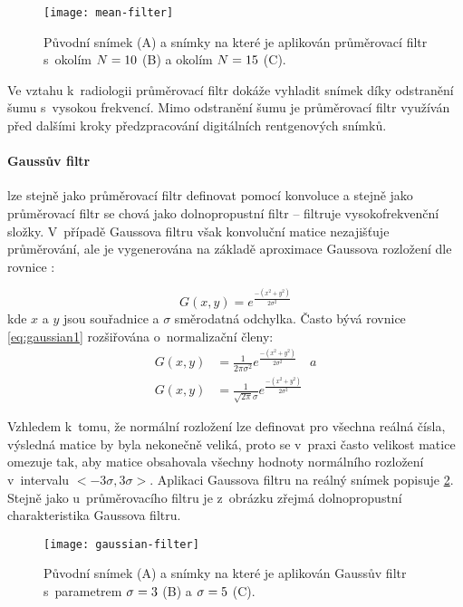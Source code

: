 \begin{figure}[htb]
\centering
\texttt{[image: mean-filter]}
\caption{Původní snímek (A) a snímky na které je aplikován průměrovací filtr s~okolím $\protect N=10$ (B) a okolím $\protect N=15$ (C).}
\label{fig:mean-filter}
\end{figure}

Ve vztahu k~radiologii průměrovací filtr dokáže vyhladit snímek díky odstranění šumu s~vysokou frekvencí. Mimo odstranění šumu je průměrovací filtr využíván před dalšími kroky předzpracování digitálních rentgenových snímků. \cite{Diagnostic-Radiology-Physics}

\paragraph{Gaussův filtr}
lze stejně jako průměrovací filtr definovat pomocí konvoluce a stejně jako průměrovací filtr se chová jako dolnopropustní filtr -- filtruje vysokofrekvenční složky. V~případě Gaussova filtru však konvoluční matice nezajišťuje průměrování, ale je vygenerována na základě aproximace Gaussova rozložení dle rovnice \cite[str.~139]{Image-Processing-Analysis-and-Machine-Vision}:

\begin{equation}
\label{eq:gaussian1}
G(x,y)=e^{\frac{-(x^2+y^2)}{2\sigma^2}}
\end{equation}
kde $x$ a $y$ jsou souřadnice a $\sigma$ směrodatná odchylka. Často bývá rovnice \ref{eq:gaussian1} rozšiřována o~normalizační členy:
\begin{align}
\label{eq:gaussian2}
G(x,y)&= \frac{1}{2\pi\sigma^2} e^{\frac{-(x^2+y^2)}{2\sigma^2}} \quad a
\\
G(x,y)&= \frac{1}{\sqrt{2\pi}\sigma} e^{\frac{-(x^2+y^2)}{2\sigma^2}}
\end{align}

Vzhledem k~tomu, že normální rozložení lze definovat pro všechna reálná čísla, výsledná matice by byla nekonečně veliká, proto se v~praxi často velikost matice omezuje tak, aby matice obsahovala všechny hodnoty normálního rozložení v~intervalu $<-3\sigma, 3\sigma>$. Aplikaci Gaussova filtru na reálný snímek popisuje \cref{fig:gaussian-filter}. Stejně jako u~průměrovacího filtru je z~obrázku zřejmá dolnopropustní charakteristika Gaussova filtru.

\begin{figure}[htb]
\centering
\texttt{[image: gaussian-filter]}
\caption{Původní snímek (A) a snímky na které je aplikován Gaussův filtr s~parametrem $\protect\sigma=3$ (B) a $\protect\sigma=5$ (C).}
\label{fig:gaussian-filter}
\end{figure}

